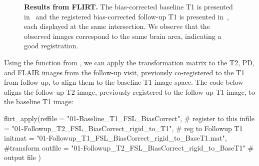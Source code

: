 \begin{figure}
\hfill
\caption{{\bf Results from FLIRT.} The bias-corrected baseline T1 is presented in~\protect{} and the registered bias-corrected follow-up T1 is presented in~\protect{}, each displayed at the same intersection. We observe that the observed images correspond to the same brain area, indicating a good registration. }
\label{fig:flirt}
\end{figure}


Using the  function from , we can apply the transformation matrix to the T2, PD, and FLAIR images from the follow-up visit, previously co-registered to the T1 from follow-up, to align them to the baseline T1 image space.  The code below aligns the follow-up T2 image, previously registered to the follow-up T1 image, to the baseline T1 image:

\newpage	
\begin{Schunk}
\begin{Sinput}
flirt_apply(reffile = "01-Baseline_T1_FSL_BiasCorrect", 
		# register to this
            infile = "01-Followup_T2_FSL_BiasCorrect_rigid_to_T1", 
            	# reg to Followup T1
            initmat = "01-Followup_T1_FSL_BiasCorrect_rigid_to_BaseT1.mat", 
            	#transform
            outfile = "01-Followup_T2_FSL_BiasCorrect_rigid_to_BaseT1" 
            	# output file
            ) 
\end{Sinput}
\end{Schunk}



